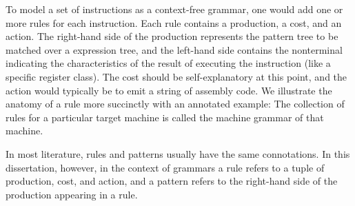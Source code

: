 {To model a set of \glspl{instruction} as a \gls{context-free grammar}, one would
add one or more \glspl{rule} for each \gls{instruction}.
%
Each rule contains a \gls{production}, a cost, and an \gls{action}.
%
The right-hand side of the \gls{production} represents the \gls{pattern tree} to
be matched over a \gls{expression tree}, and the left-hand side contains the
\gls{nonterminal} indicating the characteristics of the result of executing the
\gls{instruction} (like a specific \gls{register class}).
%
The cost should be self-explanatory at this point, and the \gls{action} would
typically be to emit a string of \gls{assembly code}.
%
We illustrate the anatomy of a \gls{rule} more succinctly with an annotated
example:%
The collection of \glspl{rule} for a particular \gls{target machine} is called
the \gls{machine grammar} of that machine.

 In most literature, \glspl{rule} and \glspl{pattern}
usually have the same connotations.
%
In this dissertation, however, in the context of \glspl{grammar} a \gls{rule}
refers to a tuple of \gls{production}, cost, and \gls{action}, and a
\gls{pattern} refers to the right-hand side of the \gls{production} appearing in
a \gls{rule}.


}
